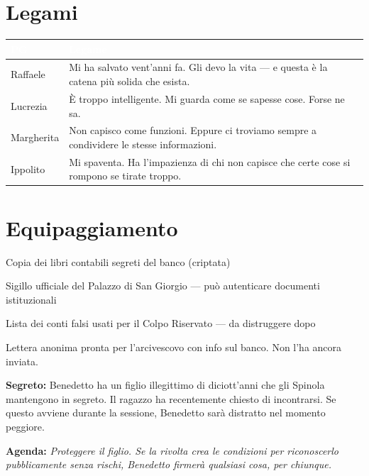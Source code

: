 \section*{Legami}
\begin{table}[h]\centering\renewcommand{\arraystretch}{1.4}
\begin{tabularx}{\linewidth}{@{}L{2.6cm} X@{}}
\toprule{}
\textcolor{white}{\textbf{PG}} & \textcolor{white}{\textbf{Legame}} \\
\midrule
Raffaele & Mi ha salvato vent'anni fa. Gli devo la vita — e questa è la catena più solida che esista. \\
Lucrezia & È troppo intelligente. Mi guarda come se sapesse cose. Forse ne sa. \\
Margherita & Non capisco come funzioni. Eppure ci troviamo sempre a condividere le stesse informazioni. \\
Ippolito & Mi spaventa. Ha l'impazienza di chi non capisce che certe cose si rompono se tirate troppo. \\
\bottomrule
\end{tabularx}
\end{table}

\section*{Equipaggiamento}
\begin{goldlist}
\item Copia dei libri contabili segreti del banco (criptata)
\item Sigillo ufficiale del Palazzo di San Giorgio — può autenticare documenti istituzionali
\item Lista dei conti falsi usati per il Colpo Riservato — da distruggere dopo
\item Lettera anonima pronta per l'arcivescovo con info sul banco. Non l'ha ancora inviata.
\end{goldlist}

\clearpage
\begin{secretbox}
\textbf{Segreto:} Benedetto ha un figlio illegittimo di diciott'anni che gli Spinola mantengono in segreto. Il ragazzo ha recentemente chiesto di incontrarsi. Se questo avviene durante la sessione, Benedetto sarà distratto nel momento peggiore.

\medskip\noindent\textcolor{SecretRed}{\textbf{Agenda:}} \textit{Proteggere il figlio. Se la rivolta crea le condizioni per riconoscerlo pubblicamente senza rischi, Benedetto firmerà qualsiasi cosa, per chiunque.}
\end{secretbox}

